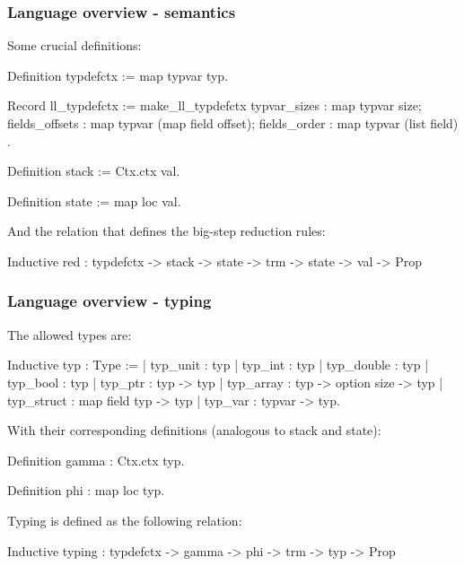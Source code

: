 \begin{frame}[fragile]
\frametitle{Language overview - semantics}

Some crucial definitions:

\begin{coqs}
  Definition typdefctx := map typvar typ.

  Record ll_typdefctx := make_ll_typdefctx {
    typvar_sizes				: map typvar size;
    fields_offsets	: map typvar (map field offset);
    fields_order				: map typvar (list field) }.
  
  Definition stack := Ctx.ctx val.

  Definition state := map loc val.
\end{coqs}

\bigskip \pause

And the relation that defines the big-step reduction rules:

\begin{coqs}
Inductive red : typdefctx -> stack -> state -> trm -> state -> val -> Prop
\end{coqs}


\end{frame}


\begin{frame}[fragile]
\frametitle{Language overview - typing}

The allowed types are:

\begin{coqs}
  Inductive typ : Type :=
    | typ_unit : typ
    | typ_int : typ
    | typ_double : typ
    | typ_bool : typ
    | typ_ptr : typ -> typ
    | typ_array : typ -> option size -> typ
    | typ_struct : map field typ -> typ
    | typ_var : typvar -> typ.
\end{coqs}

\bigskip \pause

With their corresponding definitions (analogous to stack and state):

\begin{coqs}
  Definition gamma : Ctx.ctx typ.

  Definition phi : map loc typ.
\end{coqs}

\bigskip \pause

Typing is defined as the following relation:

\begin{coqs}
Inductive typing : typdefctx -> gamma -> phi -> trm -> typ -> Prop
\end{coqs}


\end{frame}


